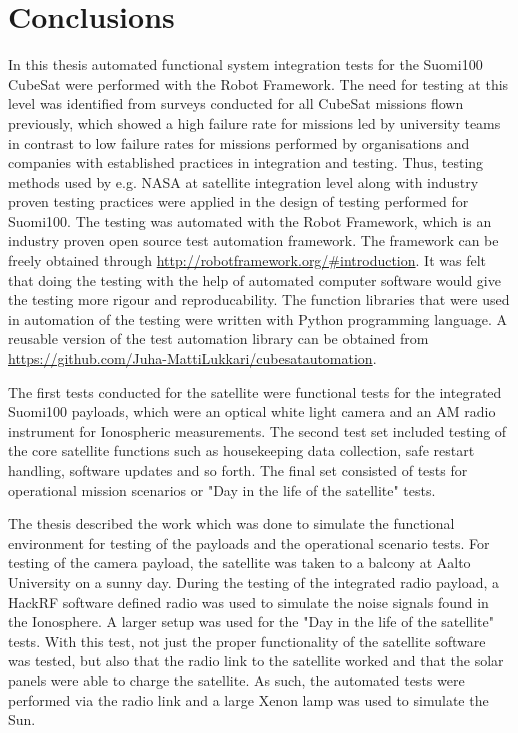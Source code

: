 \documentclass[english,12pt,a4paper,pdftex,elec,utf8]{aaltothesis}
\begin{document}
\section{Conclusions} 
In this thesis automated functional system integration tests for the Suomi100 CubeSat were performed with the Robot Framework. The need for testing at this level was identified from surveys conducted for all CubeSat missions flown previously, which showed a high failure rate for missions led by university teams in contrast to low failure rates for missions performed by organisations and companies with established practices in integration and testing. Thus, testing methods used by e.g. NASA at satellite integration level along with industry proven testing practices were applied in the design of testing performed for Suomi100. The testing was automated with the Robot Framework, which is an industry proven open source test automation framework. The framework can be freely obtained through \url{http://robotframework.org/#introduction}. It was felt that doing the testing with the help of automated computer software would give the testing more rigour and reproducability. The function libraries that were used in automation of the testing were written with Python programming language. A reusable version of the test automation library can be obtained from \url{https://github.com/Juha-MattiLukkari/cubesatautomation}.\par
The first tests conducted for the satellite were functional tests for the integrated Suomi100 payloads, which were an optical white light camera and an AM radio instrument for Ionospheric measurements. The second test set included testing of the core satellite functions  such as housekeeping data collection, safe restart handling, software updates and so forth. The final set consisted of tests for operational mission scenarios or "Day in the life of the satellite" tests.\par 
The thesis described the work which was done to simulate the functional environment for testing of the payloads and the operational scenario tests. For testing of the camera payload, the satellite was taken to a balcony at Aalto University on a sunny day. During the testing of the integrated radio payload,  a HackRF software defined radio was used to simulate the noise signals found in the Ionosphere. A larger setup was used for the "Day in the life of the satellite" tests. With this test, not just the proper functionality of the satellite software was tested, but also that the radio link to the satellite worked and that the solar panels were able to charge the satellite. As such, the automated tests were performed via the radio link and a large Xenon lamp was used to simulate the Sun.\par 
\end{document}
